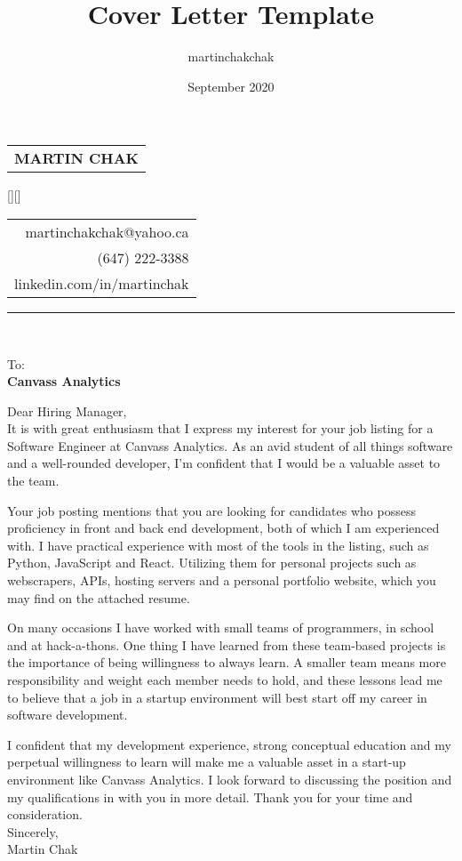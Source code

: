 \documentclass[12pt,letterpaper]{article}
\title{Cover Letter Template}
\author{martinchakchak }
\date{September 2020}
\begin{document}
\noindent
\begin{spacing}{1.125}
    \vfill\noindent
    \begin{tabular}[t]{@{}l} 
      \MakeUppercase{\fontsize{18pt}{5pt}\bf Martin Chak}
    \end{tabular}
    \hfill
    \hspace*{7.5cm}
    \raisebox{0.15cm}[\height][\depth]{
        \begin{tabular}[t]{r}
            martinchakchak@yahoo.ca\\
            (647) 222-3388\\
            linkedin.com/in/martinchak
        \end{tabular}
    }
\end{spacing}

\hrule



\noindent\\

\noindent
{\fontsize{10pt}{5pt}To:}\\
{\bf Canvass Analytics}\\

\begin{text}
    Dear Hiring Manager,\\
    
    It is with great enthusiasm that I express my interest for your job listing for a Software Engineer at Canvass Analytics. As an avid student of all things software and a well-rounded developer, I'm  confident that I would be a valuable asset to the team.
    
    Your job posting mentions that you are looking for candidates who possess proficiency in front and back end development, both of which I am experienced with. I have practical experience with most of the tools in the listing, such as Python, JavaScript and React. Utilizing them for personal projects such as webscrapers, APIs, hosting servers and a personal portfolio website, which you may find on the attached resume. 
    
    On many occasions I have worked with small teams of programmers, in school and at hack-a-thons. One thing I have learned from these team-based projects is the importance of being willingness to always learn. A smaller team means more responsibility and weight each member needs to hold, and these lessons lead me to believe that a job in a startup environment will best start off my career in software development.
    
    I confident that my development experience, strong conceptual education and my perpetual willingness to learn will make me a valuable asset in a start-up environment like Canvass Analytics. I look forward to discussing the position and my qualifications in with you in more detail. Thank you for your time and consideration.\\
    
    Sincerely,\\
    Martin Chak
\end{text}
\end{document}
